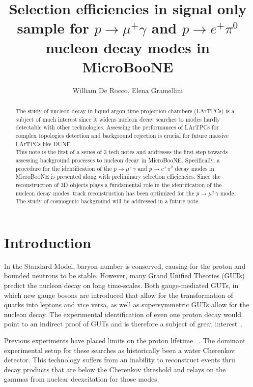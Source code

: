 \documentclass[a4paper, 10pt]{article}
\begin{document}
\title{Selection efficiencies in signal only sample for $p \rightarrow \mu^{+} \gamma$ and $p \rightarrow e^{+} \pi^{0}$ nucleon decay modes in MicroBooNE}
\author{William De Rocco, Elena Gramellini}

\maketitle

\begin{abstract}
The study of nucleon decay in liquid argon time projection chambers (LArTPCs) is a subject of much interest since it widens nucleon decay searches to modes hardly detectable with other technologies. Assessing the performances of LArTPCs  for complex topologies detection and background rejection is crucial for future massive LArTPCs like DUNE~\cite{Adams:2013qkq}.\\
This note is the first of a series of 3 tech notes and addresses the first step towards assessing background processes to nucleon decay in MicroBooNE. Specifically, a procedure for the identification of the $p \rightarrow \mu^{+} \gamma$ and $p \rightarrow e^{+} \pi^{0}$  decay modes in MicroBooNE is presented along with preliminary selection efficiencies. Since the reconstruction of 3D objects plays a fundamental role in the identification of the nucleon decay modes, track reconstruction has been optimized for the $p \rightarrow \mu^{+} \gamma$ mode. The study of cosmogenic background will be addressed in a future note.

\end{abstract}

\tableofcontents
\newpage

\section{Introduction}

In the Standard Model, baryon number is conserved, causing for the proton and bounded neutrons to be stable. However, many Grand Unified Theories (GUTs) predict the nucleon decay on long time-scales. Both gauge-mediated GUTs, in which new gauge bosons are introduced that allow for the transformation of quarks into leptons and vice versa, as well as supersymmetric GUTs allow for the nucleon decay. The experimental identification of even one proton decay would point to an indirect proof of GUTs and is therefore a subject of great interest~\cite{Adams:2013qkq}.

Previous experiments have placed limits on the proton lifetime ~\cite{Akiri:2011dv}. The dominant experimental setup for these searches as historically been a water Cherenkov detector. This technology suffers from an inability to reconstruct  events  thru decay products that are below the Cherenkov threshold and relays on the gammas from nuclear deexcitation for those modes.
\end{document}
